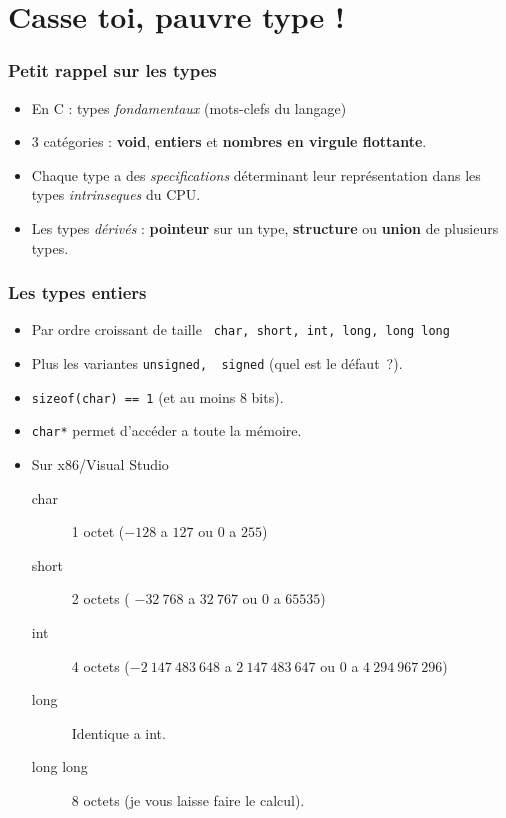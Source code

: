 \documentclass{beamer}
\begin{document}
\section{Casse toi, pauvre type !}

\begin{frame}
\frametitle{Petit rappel sur les types} 

\begin{itemize}

\item En C : types \textit{fondamentaux} (mots-clefs du langage) 
\item 3 catégories : \textbf{void}, \textbf{entiers} et \textbf{nombres en virgule flottante}.
\item Chaque type a des \textit{specifications} déterminant leur représentation dans les types \textit{intrinseques} du CPU.
\pause 
\item Les types \textit{dérivés} : \textbf{pointeur} sur un type, \textbf{structure} ou \textbf{union} de plusieurs types.


\end{itemize}

\end{frame}

\begin{frame}
\frametitle{Les types entiers}
\begin{itemize}
\item Par ordre croissant de taille \lstinline+ char, short, int, long, long long+
\item Plus les variantes \lstinline+unsigned,  signed+ (quel est le défaut~?).
\item \lstinline+sizeof(char) == 1+ (et au moins 8 bits).
\item \lstinline+char*+ permet d'accéder a toute la mémoire.
\pause
\item Sur x86/Visual Studio 
\begin{description}
  \item[char] 1 octet ($-128$ a $127$ ou $0$ a $255$)
  \item[short] 2 octets ( $-32~768$ a $32~767$ ou $0$ a $65535$)
  \item[int] 4 octets ($-2~147~483~ 648$ a $2~147~483~ 647$ ou $0$ a $4~294~967~296$)
  \item[long] Identique a int.
  \item[long long] 8 octets (je vous laisse faire le calcul).
\end{description}

\end{itemize}
\end{frame}
\end{document}
